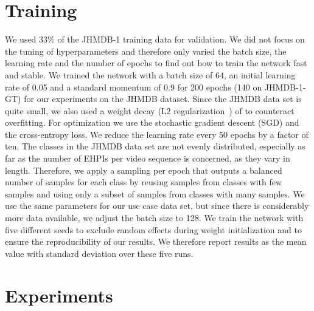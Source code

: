 \documentclass[a4paper, 10pt, conference]{ieeeconf}
\begin{document}
\begin{minipage}{\textwidth}
\section{Training}
We used 33\% of the JHMDB-1 training data for validation. We did not focus on the tuning of hyperparameters and therefore only varied the batch size, the learning rate and the number of epochs to find out how to train the network fast and stable. We trained the network with a batch size of 64, an initial learning rate of 0.05 and a standard momentum of 0.9 for 200 epochs (140 on JHMDB-1-GT) for our experiments on the JHMDB dataset. Since the JHMDB data set is quite small, we also used a weight decay (L2 regularization~\cite{ngFeatureSelectionL12004}) of  to counteract overfitting. For optimization we use the stochastic gradient descent (SGD) and the cross-entropy loss. We reduce the learning rate every 50 epochs by a factor of ten. The classes in the JHMDB data set are not evenly distributed, especially as far as the number of EHPIs per video sequence is concerned, as they vary in length. Therefore, we apply a sampling per epoch that outputs a balanced number of samples for each class by reusing samples from classes with few samples and using only a subset of samples from classes with many samples. We use the same parameters for our use case data set, but since there is considerably more data available, we adjust the batch size to 128. We train the network with five different seeds to exclude random effects during weight initialization and to ensure the reproducibility of our results. We therefore report results as the mean value with standard deviation over these five runs.











\section{Experiments}

\end{minipage}
\end{document}

